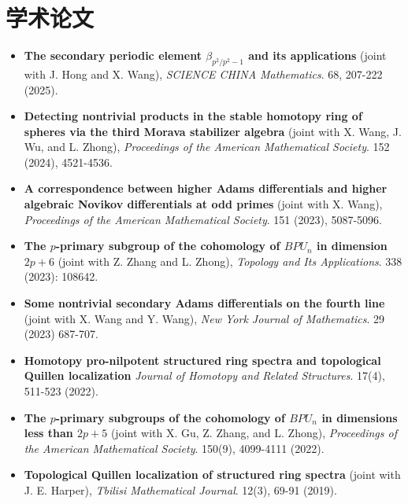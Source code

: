 \documentclass[12pt,a4paper,sans,fontset=windows]{moderncv} %
\begin{document}

\vspace{20pt} 



\section{学术论文}

\vspace{3pt} 

\begin{itemize}[wide=30pt, leftmargin=*]
    \item \textbf{The secondary periodic element $\beta_{p^2/p^2-1}$ and its applications}
        \newline (joint with J. Hong and X. Wang), \textit{SCIENCE CHINA Mathematics}. 68, 207-222 (2025).
    \item \textbf{Detecting nontrivial products in the stable homotopy ring of spheres via the third Morava stabilizer algebra}
    \newline (joint with X. Wang, J. Wu, and L. Zhong), \textit{Proceedings of the American Mathematical Society}. 152 (2024), 4521-4536.
    \item \textbf{A correspondence between higher Adams differentials and higher algebraic Novikov differentials at odd primes}
        \newline (joint with X. Wang), \textit{Proceedings of the American Mathematical Society}. 151 (2023), 5087-5096.
    \item \textbf{The $p$-primary subgroup of the cohomology of $BPU_n$ in dimension $2p+6$}
        \newline (joint with Z. Zhang and L. Zhong), \textit{Topology and Its Applications}.  338 (2023): 108642.
    \item \textbf{Some nontrivial secondary Adams differentials on the fourth line}
        \newline (joint with X. Wang and Y. Wang),  \textit{New York Journal of Mathematics}.  29 (2023) 687-707.
    \item \textbf{Homotopy pro-nilpotent structured ring spectra and topological Quillen localization}
        \newline \textit{Journal of Homotopy and Related Structures}. 17(4), 511-523 (2022).
    \item \textbf{The $p$-primary subgroups of the cohomology of $BPU_n$ in dimensions less than $2p+5$}
        \newline (joint with X. Gu, Z. Zhang, and L. Zhong), \textit{Proceedings of the American Mathematical Society}. 150(9), 4099-4111 (2022). 
    \item \textbf{Topological Quillen localization of structured ring spectra}
        \newline (joint with J. E. Harper), \textit{Tbilisi Mathematical Journal}. 12(3), 69-91 (2019). 
\end{itemize}
\end{document}
